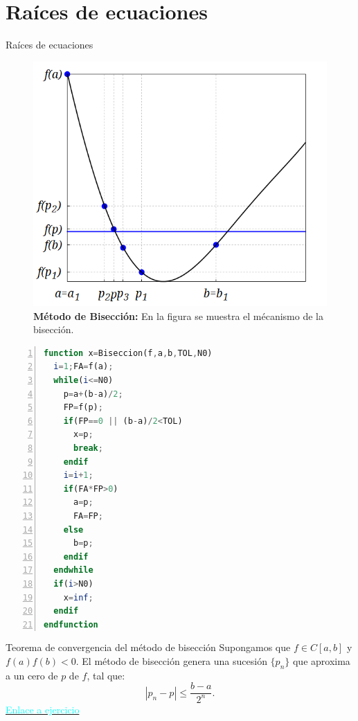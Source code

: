 \section{Raíces de ecuaciones}
\begin{frame}{Raíces de ecuaciones}
\label{RetornoTeoremaRaices1}
\begin{figure}[H]
\begin{center}
\includegraphics[scale=0.7]{Imagen20}
\end{center}
\caption{\textbf{Método de Bisección: }En la figura se muestra el mécanismo de la bisección.}
\end{figure}
\label{RetornoTeoremaRaices2}
\begin{lstlisting}[caption=''Método de Bisección'',style=mystyle,language=octave,numbers=left]
function x=Biseccion(f,a,b,TOL,N0)
  i=1;FA=f(a);
  while(i<=N0)
    p=a+(b-a)/2;
    FP=f(p);
    if(FP==0 || (b-a)/2<TOL)
      x=p;
      break;
    endif
    i=i+1;
    if(FA*FP>0) 
      a=p;
      FA=FP;
    else
      b=p;  
    endif
  endwhile
  if(i>N0)
    x=inf;
  endif
endfunction
\end{lstlisting}
\label{RetornoTeoremaRaices3}
\begin{block}{Teorema de convergencia del método de bisección}
Supongamos que $f\in C[a,b]$ y $f(a)f(b)<0$. El método de bisección genera una sucesión $\{p_n\}$ que aproxima a un cero de $p$ de $f$, tal que:
$$|p_n-p|\leq \dfrac{b-a}{2^n}.$$
\hyperlink{EjercicioBiseccion}{\textcolor{cyan}{Enlace a ejercicio}}
\end{block}

\end{frame}
